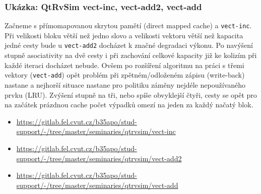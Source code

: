 \begin{frame}
\frametitle{Ukázka: QtRvSim vect-inc, vect-add2, vect-add}

Začneme s přímomapovanou skrytou pamětí (direct mapped cache) a \texttt{vect-inc}. Při velikosti bloku větší než jedno slovo a velikosti vektoru větší než kapacita jedné cesty bude u \texttt{vect-add2} docházet k značné degradaci výkonu. Po navýšení stupně asociativity na dvě cesty i při zachování celkové kapacity již ke kolizím při každé iteraci docházet nebude. Ovšem po rozšíření algoritmu na práci s třemi vektory (\texttt{vect-add}) opět problém při zpětném/odloženém zápisu (write-back) nastane a nejhorší situace nastane pro politiku záměny nejdéle nepoužívaného prvku (LRU). Zvýšení stupně na tři, nebo spíše obvyklejší čtyři, cesty se opět pro na začátek prázdnou cache počet výpadků omezí na jeden za každý načatý blok.

\begin{itemize}
\item \url{https://gitlab.fel.cvut.cz/b35apo/stud-support/-/tree/master/seminaries/qtrvsim/vect-inc}
\item \url{https://gitlab.fel.cvut.cz/b35apo/stud-support/-/tree/master/seminaries/qtrvsim/vect-add2}
\item \url{https://gitlab.fel.cvut.cz/b35apo/stud-support/-/tree/master/seminaries/qtrvsim/vect-add}
\end{itemize}

\end{frame}
